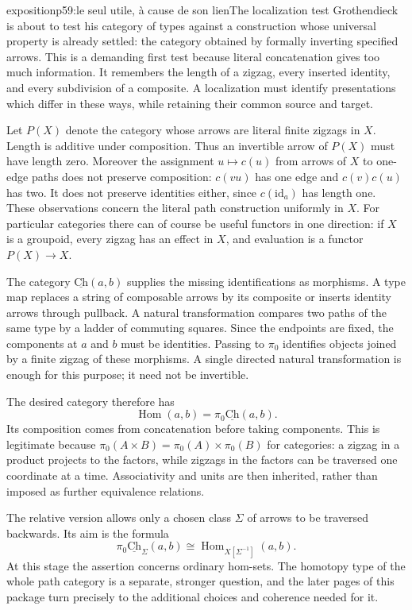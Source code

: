 \begin{dcomment}{exposition}{p59:le seul utile, à cause de son lien}{The localization test}
Grothendieck is about to test his category of types against a construction whose universal property is already settled: the category obtained by formally inverting specified arrows. This is a demanding first test because literal concatenation gives too much information. It remembers the length of a zigzag, every inserted identity, and every subdivision of a composite. A localization must identify presentations which differ in these ways, while retaining their common source and target.

Let $P(X)$ denote the category whose arrows are literal finite zigzags in $X$. Length is additive under composition. Thus an invertible arrow of $P(X)$ must have length zero. Moreover the assignment $u\mapsto c(u)$ from arrows of $X$ to one-edge paths does not preserve composition: $c(vu)$ has one edge and $c(v)c(u)$ has two. It does not preserve identities either, since $c(\mathrm{id}_a)$ has length one. These observations concern the literal path construction uniformly in $X$. For particular categories there can of course be useful functors in one direction: if $X$ is a groupoid, every zigzag has an effect in $X$, and evaluation is a functor $P(X)\to X$.

The category $\underline{\mathrm{Ch}}(a,b)$ supplies the missing identifications as morphisms. A type map replaces a string of composable arrows by its composite or inserts identity arrows through pullback. A natural transformation compares two paths of the same type by a ladder of commuting squares. Since the endpoints are fixed, the components at $a$ and $b$ must be identities. Passing to $\pi_0$ identifies objects joined by a finite zigzag of these morphisms. A single directed natural transformation is enough for this purpose; it need not be invertible.

The desired category therefore has
\[
 \operatorname{Hom}(a,b)=\pi_0\underline{\mathrm{Ch}}(a,b).
\]
Its composition comes from concatenation before taking components. This is legitimate because $\pi_0(A\times B)=\pi_0(A)\times\pi_0(B)$ for categories: a zigzag in a product projects to the factors, while zigzags in the factors can be traversed one coordinate at a time. Associativity and units are then inherited, rather than imposed as further equivalence relations.

The relative version allows only a chosen class $\Sigma$ of arrows to be traversed backwards. Its aim is the formula
\[
 \pi_0\underline{\mathrm{Ch}}_\Sigma(a,b)
       \cong \operatorname{Hom}_{X[\Sigma^{-1}]}(a,b).
\]
At this stage the assertion concerns ordinary hom-sets. The homotopy type of the whole path category is a separate, stronger question, and the later pages of this package turn precisely to the additional choices and coherence needed for it.
\end{dcomment}

